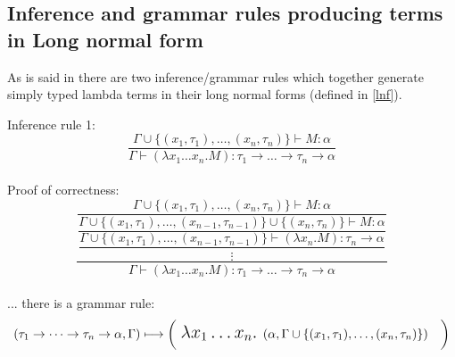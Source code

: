 \documentclass[12pt,a4paper]{report}
\begin{document}
\subsection{Inference and grammar rules producing 
terms in Long normal form}
\label{barlike}

As is said in \cite{barendregt10} there are two
inference/grammar rules which together generate
simply typed lambda terms in their long normal forms
(defined in \ref{lnf}).


Inference rule 1: 
\[
	\frac{\Gamma \cup \{ (x_1,\tau_1),\dots,(x_n,\tau_n) \} \vdash M : \alpha }
	     {\Gamma \vdash (\lambda x_1 \dots x_n . M) : 
	     \tau_1 \rightarrow \dots \rightarrow \tau_n \rightarrow \alpha }
\]
\\
Proof of correctness:
\[
	\dfrac{
		\dfrac
		 {\Gamma \cup \{ (x_1,\tau_1),\dots,(x_n,\tau_n) \} \vdash M : \alpha}
		 {\dfrac
		   {\Gamma \cup \{ (x_1,\tau_1),\dots,(x_{n-1},\tau_{n-1})\} \cup 
		                \{(x_n,\tau_n) \} \vdash M : \alpha}
		   {\dfrac{\Gamma \cup \{ (x_1,\tau_1),\dots,(x_{n-1},\tau_{n-1})\}  
		                \vdash (\lambda x_n . M) : \tau_n \rightarrow \alpha}
				  { \vdots }		   
		   }
		 }		 
	 }
	     {\Gamma \vdash (\lambda x_1 \dots x_n . M) : 
	     \tau_1 \rightarrow \dots \rightarrow \tau_n \rightarrow \alpha }
\]
\\
... there is a grammar rule:
\[ 
	( \tau_1 \rightarrow \dots \rightarrow \tau_n \rightarrow \alpha , \Gamma )  \longmapsto
	\bigg( \mbox{ {\Large 
	$\lambda x_1 \dots x_n .$ 
	}}( \alpha , \Gamma \cup \{ (x_1,\tau_1),\dots,(x_n,\tau_n) \} ) \quad \bigg)
\]
\\
\end{document}

